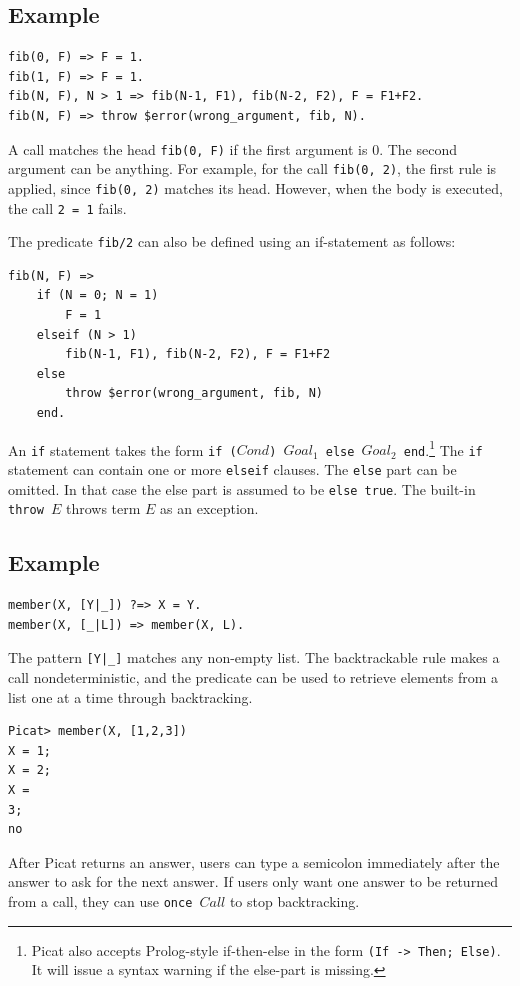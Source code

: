 \subsection*{Example}
\begin{verbatim}
fib(0, F) => F = 1.
fib(1, F) => F = 1.
fib(N, F), N > 1 => fib(N-1, F1), fib(N-2, F2), F = F1+F2.
fib(N, F) => throw $error(wrong_argument, fib, N).
\end{verbatim}

A call matches the head \texttt{fib(0, F)} if the first argument is 0. The second argument can be anything. For example, for the call \texttt{fib(0, 2)}, the first rule is applied, since \texttt{fib(0, 2)} matches its head. However, when the body is executed, the call \texttt{2 = 1} fails.  

The predicate \texttt{fib/2} can also be defined using an if-statement as follows:
\begin{verbatim}
fib(N, F) => 
    if (N = 0; N = 1)
        F = 1 
    elseif (N > 1)
        fib(N-1, F1), fib(N-2, F2), F = F1+F2
    else 
        throw $error(wrong_argument, fib, N)
    end.
\end{verbatim}
An \texttt{if} statement takes the form \texttt{if ($Cond$) $Goal_1$ else $Goal_2$ end}.\footnote{Picat also accepts Prolog-style if-then-else in the form \texttt{(If -> Then; Else)}. It will issue a syntax warning if the else-part is missing.} The \texttt{if} statement can contain one or more \texttt{elseif} clauses. The \texttt{else} part can be omitted. In that case the else part is assumed to be \texttt{else true}. The built-in \texttt{throw $E$} throws term $E$ as an exception.

\subsection*{Example}
\begin{verbatim}
member(X, [Y|_]) ?=> X = Y.
member(X, [_|L]) => member(X, L).
\end{verbatim}

The pattern \verb+[Y|_]+ matches any non-empty list. The backtrackable rule makes a call nondeterministic, and the predicate can be used to retrieve elements from a list one at a time through backtracking.
\begin{verbatim}
Picat> member(X, [1,2,3])
X = 1;
X = 2;
X =
3;
no
\end{verbatim}
After Picat returns an answer, users can type a semicolon immediately after the answer to ask for the next answer. If users only want one answer to be returned from a call, they can use \texttt{once $Call$} to stop backtracking.


